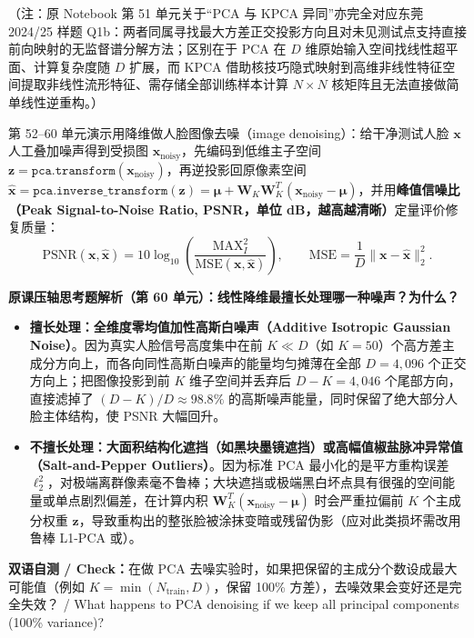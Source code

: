 （注：原 Notebook 第 51 单元关于“PCA 与 KPCA 异同”亦完全对应东莞 2024/25 样题 Q1b：两者同属寻找最大方差正交投影方向且对未见测试点支持直接前向映射的无监督谱分解方法；区别在于 PCA 在 $D$ 维原始输入空间找线性超平面、计算复杂度随 $D$ 扩展，而 KPCA 借助核技巧隐式映射到高维非线性特征空间提取非线性流形特征、需存储全部训练样本计算 $N\times N$ 核矩阵且无法直接做简单线性逆重构。）



第 52–60 单元演示用降维做人脸图像去噪（image denoising）：给干净测试人脸 $\mathbf{x}$ 人工叠加噪声得到受损图 $\mathbf{x}_{\mathrm{noisy}}$，先编码到低维主子空间 $\mathbf{z} = \texttt{pca.transform}(\mathbf{x}_{\mathrm{noisy}})$，再逆投影回原像素空间 $\hat{\mathbf{x}} = \texttt{pca.inverse\_transform}(\mathbf{z}) = \boldsymbol{\mu} + \mathbf{W}_K \mathbf{W}_K^T (\mathbf{x}_{\mathrm{noisy}} - \boldsymbol{\mu})$，并用\textbf{峰值信噪比（Peak Signal-to-Noise Ratio, PSNR，单位 dB，越高越清晰）}定量评价修复质量：
\[
\mathrm{PSNR}(\mathbf{x}, \hat{\mathbf{x}}) = 10 \log_{10}\!\left(\frac{\mathrm{MAX}_I^2}{\mathrm{MSE}(\mathbf{x}, \hat{\mathbf{x}})}\right), \qquad \mathrm{MSE} = \frac{1}{D}\|\mathbf{x} - \hat{\mathbf{x}}\|_2^2.
\tag{T8.1}
\]

\textbf{原课压轴思考题解析（第 60 单元）：线性降维最擅长处理哪一种噪声？为什么？}
\begin{itemize}
\item \textbf{擅长处理：全维度零均值加性高斯白噪声（Additive Isotropic Gaussian Noise）}。因为真实人脸信号高度集中在前 $K \ll D$（如 $K=50$）个高方差主成分方向上，而各向同性高斯白噪声的能量均匀摊薄在全部 $D = 4{,}096$ 个正交方向上；把图像投影到前 $K$ 维子空间并丢弃后 $D - K = 4{,}046$ 个尾部方向，直接滤掉了 $(D-K)/D \approx 98.8\%$ 的高斯噪声能量，同时保留了绝大部分人脸主体结构，使 PSNR 大幅回升。
\item \textbf{不擅长处理：大面积结构化遮挡（如黑块墨镜遮挡）或高幅值椒盐脉冲异常值（Salt-and-Pepper Outliers）}。因为标准 PCA 最小化的是平方重构误差 $\ell_2^2$，对极端离群像素毫不鲁棒；大块遮挡或极端黑白坏点具有很强的空间能量或单点剧烈偏差，在计算内积 $\mathbf{W}_K^T(\mathbf{x}_{\mathrm{noisy}}-\boldsymbol{\mu})$ 时会严重拉偏前 $K$ 个主成分权重 $\mathbf{z}$，导致重构出的整张脸被涂抹变暗或残留伪影（应对此类损坏需改用鲁棒 L1-PCA 或）。
\end{itemize}

\textbf{双语自测 / Check：}在做 PCA 去噪实验时，如果把保留的主成分个数设成最大可能值（例如 $K = \min(N_{\mathrm{train}}, D)$，保留 100\% 方差），去噪效果会变好还是完全失效？ / What happens to PCA denoising if we keep all principal components (100\% variance)?


